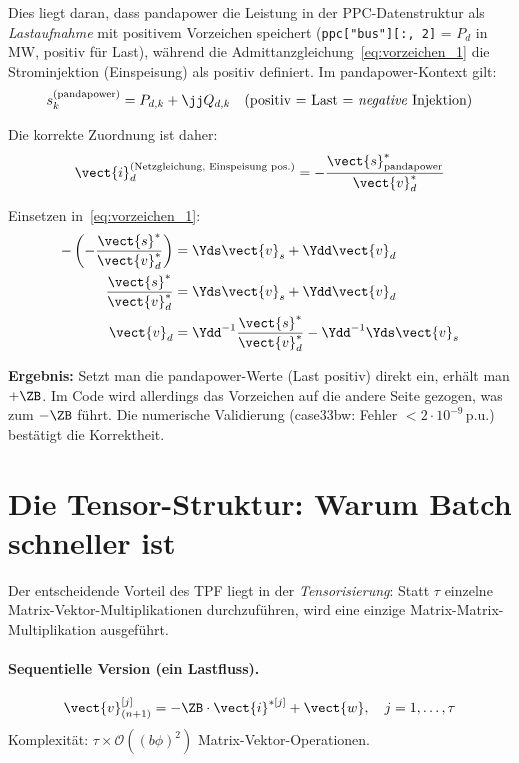 Dies liegt daran, dass pandapower die Leistung in der PPC-Datenstruktur als \textit{Lastaufnahme} mit positivem Vorzeichen speichert (\texttt{ppc["bus"][:, 2]} = $P_d$ in MW, positiv für Last), während die Admittanzgleichung~\eqref{eq:vorzeichen_1} die Strominjektion (Einspeisung) als positiv definiert. Im pandapower-Kontext gilt:
\begin{equation}
	s_k^{\text{(pandapower)}} = P_{d,k} + \jj Q_{d,k} \quad \text{(positiv = Last = \textit{negative} Injektion)}
	\label{eq:pandapower_konvention}
\end{equation}

Die korrekte Zuordnung ist daher:
\begin{equation}
	\vect{i}_d^{\text{(Netzgleichung, Einspeisung pos.)}} = -\frac{\vect{s}_{\text{pandapower}}^*}{\vect{v}_d^*}
	\label{eq:strom_zuordnung}
\end{equation}

Einsetzen in~\eqref{eq:vorzeichen_1}:
\begin{align}
	-\left(-\frac{\vect{s}^*}{\vect{v}_d^*}\right) &= \Yds \vect{v}_s + \Ydd \vect{v}_d \nonumber\\
	\frac{\vect{s}^*}{\vect{v}_d^*} &= \Yds \vect{v}_s + \Ydd \vect{v}_d \nonumber\\
	\vect{v}_d &= \Ydd^{-1} \frac{\vect{s}^*}{\vect{v}_d^*} - \Ydd^{-1}\Yds\vect{v}_s \nonumber
\end{align}

\textbf{Ergebnis:} Setzt man die pandapower-Werte (Last positiv) direkt ein, erhält man $+\ZB$. Im Code wird allerdings das Vorzeichen auf die andere Seite gezogen, was zum $-\ZB$ führt. Die numerische Validierung (case33bw: Fehler $< 2 \cdot 10^{-9}$\,p.u.) bestätigt die Korrektheit.

\section{Die Tensor-Struktur: Warum Batch schneller ist}
\label{sec:tensor_struktur}

Der entscheidende Vorteil des TPF liegt in der \textit{Tensorisierung}: Statt $\tau$ einzelne Matrix-Vektor-Multiplikationen durchzuführen, wird eine einzige Matrix-Matrix-Multiplikation ausgeführt.

\paragraph{Sequentielle Version (ein Lastfluss).}
\begin{equation}
	\vect{v}_{(n+1)}^{[j]} = -\ZB \cdot \vect{i}^{*[j]} + \vect{w}, \quad j = 1, \ldots, \tau
	\label{eq:sequentiell}
\end{equation}
Komplexität: $\tau \times \mathcal{O}((b\phi)^2)$ Matrix-Vektor-Operationen.

